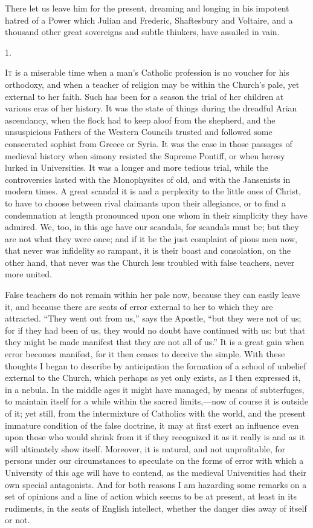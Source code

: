 There let us leave him for the present, dreaming and longing in his
impotent hatred of a Power which Julian and Frederic, Shaftesbury and
Voltaire, and a thousand other great sovereigns and subtle thinkers,
have assailed in vain.


1.

I\textsc{t} is a miserable time when a man's Catholic profession is no
voucher for his orthodoxy, and when a teacher of religion may be
within the Church's pale, yet external to her faith. Such has been for
a season the trial of her children at various eras of her history. It
was the state of things during the dreadful Arian ascendancy, when the
flock had to keep aloof from the shepherd, and the unsuspicious
Fathers of the Western Councils trusted and followed some consecrated
sophist from Greece or Syria. It was the case in those passages of
medieval history when simony resisted the Supreme Pontiff, or when
heresy lurked in Universities. It was a longer and more tedious trial,
while the controversies lasted with the Monophysites of old, and with
the Jansenists in modern times. A great scandal it is and a perplexity
to the little ones of Christ, to have to choose between rival
claimants upon their allegiance, or to find a condemnation at length
pronounced upon one whom in their simplicity they have admired. We,
too, in this age have our scandals, for scandals must be; but they are
not what they were once; and if it be the just complaint of pious men
now, that never was infidelity so rampant, it is their boast and
consolation, on the other hand, that never was the Church less
troubled with false teachers, never more united.

False teachers do not remain within her pale now, because
they can easily leave it, and because there are seats of error
external to her to which they are attracted. ``They went out from
us,'' says the Apostle, ``but they were not of us; for if they
had been of us, they would no doubt have continued with us: but that
they might be made manifest that they are not all of us.'' It is a
great gain when error becomes manifest, for it then ceases to deceive
the simple. With these thoughts I began to describe by anticipation
the formation of a school of unbelief external to the Church, which
perhaps as yet only exists, as I then expressed it, in a nebula. In
the middle ages it might have managed, by means of subterfuges, to
maintain itself for a while within the sacred limits,—now of course
it is outside of it; yet still, from the intermixture of Catholics
with the world, and the present immature condition of the false
doctrine, it may at first exert an influence even upon those who would
shrink from it if they recognized it as it really is and as it will
ultimately show itself. Moreover, it is natural, and not unprofitable,
for persons under our circumstances to speculate on the forms of error
with which a University of this age will have to contend, as the
medieval Universities had their own special antagonists. And for both
reasons I am hazarding some remarks on a set of opinions and a line of
action which seems to be at present, at least in its rudiments, in the
seats of English intellect, whether the danger dies away of itself or
not.

